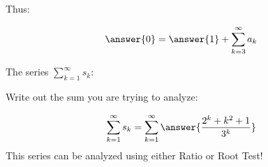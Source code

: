 \documentclass{ximera}
\begin{document}
\begin{exercise}
\begin{exercise}
\begin{exercise}
\begin{exercise}
Thus:

\[
\answer{0} = \answer{1} + \sum_{k=3}^{\infty} a_k
\]
\begin{exercise}
The series $\sum_{k=1}^{\infty} s_k$: 

\begin{multipleChoice}
\end{multipleChoice}

\begin{hint}
Write out the sum you are trying to analyze:

\[
\sum_{k=1}^{\infty} s_k = \sum_{k=1}^{\infty} \answer{\frac{2^k+k^2+1}{3^k}}
\]
This series can be analyzed using either Ratio or Root Test!

\end{hint}
\end{exercise}
\end{exercise}
\end{exercise}
\end{exercise}
\end{exercise}
\end{document}
